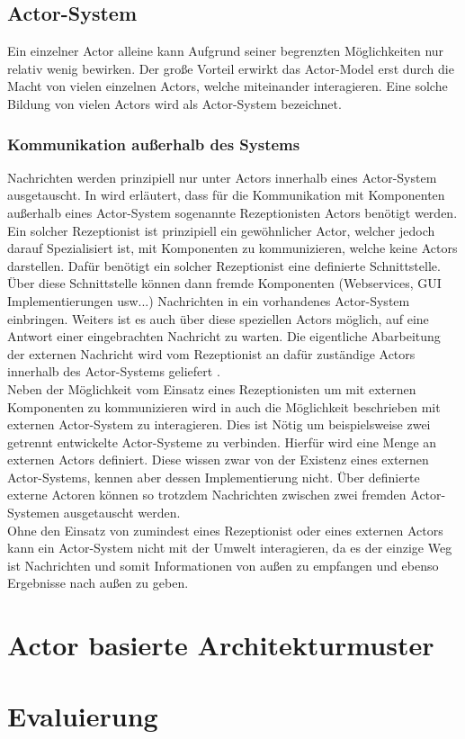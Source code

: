 \subsection{Actor-System}\label{actor:actorSystem}
Ein einzelner Actor alleine kann Aufgrund seiner begrenzten Möglichkeiten nur relativ wenig bewirken. Der große Vorteil erwirkt das Actor-Model erst durch die Macht von vielen einzelnen Actors, welche miteinander interagieren. Eine solche Bildung von vielen Actors wird als Actor-System bezeichnet.\citep{Agha1985ActorsSystems}
\subsubsection{Kommunikation außerhalb des Systems}
Nachrichten werden prinzipiell nur unter Actors innerhalb eines Actor-System ausgetauscht. In \cite{Agha1985ActorsSystems} wird erläutert, dass für die Kommunikation mit Komponenten außerhalb eines Actor-System sogenannte Rezeptionisten Actors benötigt werden.\\
Ein solcher Rezeptionist ist prinzipiell ein gewöhnlicher Actor, welcher jedoch darauf Spezialisiert ist, mit Komponenten  zu kommunizieren, welche keine Actors darstellen. Dafür benötigt ein solcher Rezeptionist eine definierte Schnittstelle. Über diese Schnittstelle können dann fremde Komponenten (Webservices, GUI Implementierungen  usw...) Nachrichten in ein vorhandenes Actor-System einbringen. Weiters ist es auch über diese speziellen Actors möglich, auf eine Antwort einer eingebrachten Nachricht zu warten. Die eigentliche Abarbeitung der externen Nachricht wird vom Rezeptionist an dafür zuständige Actors innerhalb des Actor-Systems geliefert \citep{Agha1985ActorsSystems}.\\
Neben der Möglichkeit vom Einsatz eines Rezeptionisten um mit externen Komponenten zu kommunizieren wird in \cite{Agha1985ActorsSystems} auch die Möglichkeit beschrieben mit externen Actor-System zu interagieren. Dies ist Nötig um beispielsweise zwei getrennt entwickelte Actor-Systeme zu verbinden. Hierfür wird eine Menge an externen Actors definiert. Diese wissen zwar von der Existenz eines externen Actor-Systems, kennen aber dessen Implementierung nicht. Über definierte externe Actoren können so trotzdem Nachrichten zwischen zwei fremden Actor-Systemen ausgetauscht werden. \\
Ohne den Einsatz von zumindest eines Rezeptionist oder eines externen Actors kann ein Actor-System nicht mit der Umwelt interagieren, da es der einzige Weg ist Nachrichten und somit Informationen von außen zu empfangen und ebenso Ergebnisse nach außen zu geben. 





\section{Actor basierte Architekturmuster}
\label{theory:actorArchitecture}
\section{Evaluierung}

